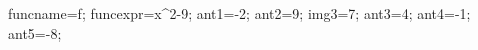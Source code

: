 \documentclass[exercice]{thedocument}%
\begin{document}
%
    \>funcname=f;%
    \>funcexpr=x^2-9;%
    \>ant1=-2;%
    \>ant2=9;%
    \>img3=7;%
    \>ant3=4;%
    \>ant4=-1;%
    \>ant5=-8;%
\end{document}
